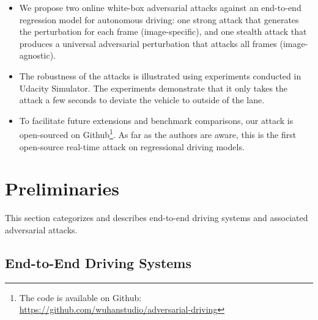 \begin{itemize}
    \item We propose two online white-box adversarial attacks against an end-to-end regression model for autonomous driving: one strong attack that generates the perturbation for each frame (image-specific), and one stealth attack that produces a universal adversarial perturbation that attacks all frames (image-agnostic).
    \item The robustness of the attacks is illustrated using experiments conducted in Udacity Simulator. 
    The experiments demonstrate that it only takes the attack a few seconds to deviate the vehicle to outside of the lane.
    \item To facilitate future extensions and benchmark comparisons, our attack is open-sourced on Github\footnote{The code is available on Github: \url{https://github.com/wuhanstudio/adversarial-driving}}. As far as the authors are aware, this is the first open-source real-time attack on regressional driving models.
\end{itemize}


\section{Preliminaries}


This section categorizes and describes end-to-end driving systems and associated adversarial attacks.

\subsection{End-to-End Driving Systems}


